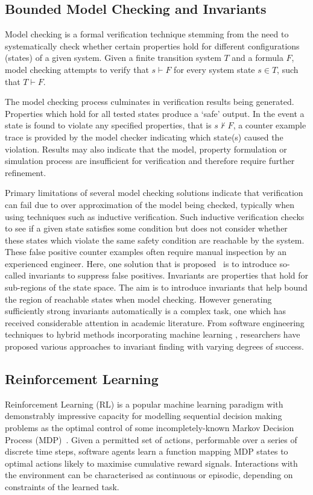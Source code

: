 \documentclass[runningheads]{llncs}
\begin{document}
\subsection{Bounded Model Checking and Invariants}

Model checking is a formal verification technique stemming from the need to systematically
check whether certain properties hold for different configurations (states) of a given system.
Given a finite transition system $T$ and a formula $F$, model checking attempts to verify
that $s \vdash F$ for every system state $s \in T$, such that $T \vdash F$. 

The model checking process culminates in verification results being generated. Properties which hold for all tested states
produce a ‘safe’ output. In the event a state is found to violate any specified properties, that 
is $s \nvdash F$, a counter example trace is provided by the model checker indicating which state(s)
caused the violation. Results may also indicate that the model, property formulation or
simulation process are insufficient for verification and therefore require further refinement.

Primary limitations of several model checking solutions indicate that verification can fail due to over approximation of the model being checked, typically when using techniques such as inductive verification. Such inductive verification checks to see if a given state satisfies
some condition but does not consider whether these states which violate
the same safety condition are reachable by the system. These false positive  counter examples often require manual inspection by an
experienced engineer. Here, one solution that is proposed~\cite{1688959} is to introduce so-called invariants to suppress false positives. Invariants are properties that hold for sub-regions of the state space. The aim is to introduce invariants that help bound the region of reachable states when model checking. However generating sufficiently strong invariants automatically is a complex task, one which has received considerable attention in academic
literature. From software engineering techniques \cite{case2007automated, bensalem1996powerful} to hybrid methods incorporating machine learning \cite{garg2016learning}, researchers have proposed various approaches to invariant finding with varying degrees of success.

\subsection{Reinforcement Learning}
Reinforcement Learning (RL) is a popular machine learning paradigm with demonstrably impressive capacity for modelling sequential decision making problems as the optimal control of some incompletely-known Markov Decision Process (MDP)~\cite{sutton2018reinforcement}. Given a permitted set of actions, performable over a series of discrete time steps, software agents learn a function mapping MDP states to optimal actions likely to maximise cumulative reward signals. Interactions with the environment can be characterised as continuous or episodic, depending on constraints of the learned task.
 
\end{document}
